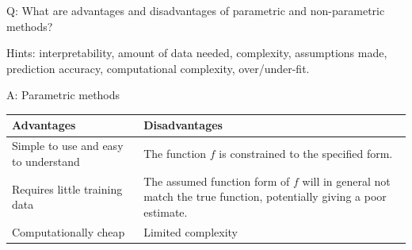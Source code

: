 \documentclass[ignorenonframetext,]{beamer}
\begin{document}
\begin{frame}

\begin{block}{Q: What are advantages and disadvantages of parametric and
non-parametric methods?}

Hints: interpretability, amount of data needed, complexity, assumptions
made, prediction accuracy, computational complexity, over/under-fit.

\end{block}

\end{frame}

\begin{frame}

\begin{block}{A: Parametric methods}

\begin{longtable}[]{@{}ll@{}}
\toprule
\begin{minipage}[b]{0.47\columnwidth}\raggedright\strut
Advantages\strut
\end{minipage} & \begin{minipage}[b]{0.47\columnwidth}\raggedright\strut
Disadvantages\strut
\end{minipage}\tabularnewline
\midrule
\endhead
\begin{minipage}[t]{0.47\columnwidth}\raggedright\strut
Simple to use and easy to understand\strut
\end{minipage} & \begin{minipage}[t]{0.47\columnwidth}\raggedright\strut
The function \(f\) is constrained to the specified form.\strut
\end{minipage}\tabularnewline
\begin{minipage}[t]{0.47\columnwidth}\raggedright\strut
Requires little training data\strut
\end{minipage} & \begin{minipage}[t]{0.47\columnwidth}\raggedright\strut
The assumed function form of \(f\) will in general not match the true
function, potentially giving a poor estimate.\strut
\end{minipage}\tabularnewline
\begin{minipage}[t]{0.47\columnwidth}\raggedright\strut
Computationally cheap\strut
\end{minipage} & \begin{minipage}[t]{0.47\columnwidth}\raggedright\strut
Limited complexity\strut
\end{minipage}\tabularnewline
\bottomrule
\end{longtable}

\end{block}

\end{frame}
\end{document}
